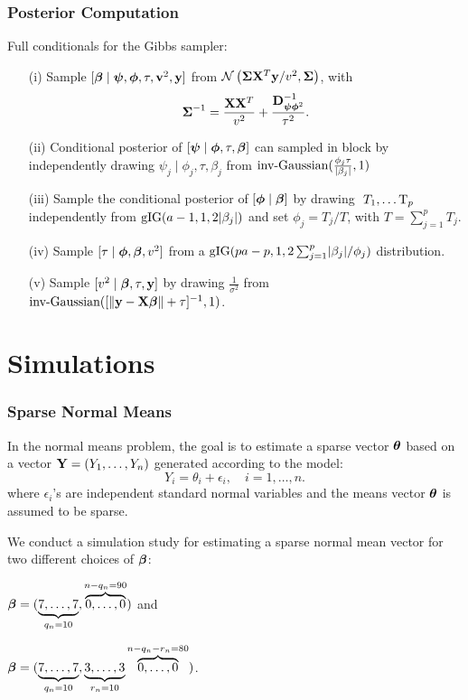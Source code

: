\documentclass[10pt]{beamer}
\theoremstyle{plain}
\newcommand{\blankline}{\quad\pagebreak[3]}
\begin{document}
\begin{frame}
	\frametitle{Posterior Computation}
	Full conditionals for the Gibbs sampler:
	\begin{itemize}
\item[(i)] Sample $[ \boldsymbol{\beta} \mid \boldsymbol{\psi} , \boldsymbol{\phi} , \tau , {\bf v}^2 , {\bf y} ]$ from $\mathcal{N} \left( \boldsymbol{\Sigma} {\bf X}^T{\bf y}/v^2 , \boldsymbol{\Sigma} \right)$, with $$ \boldsymbol{\Sigma}^{-1} = \frac{{\bf X}{\bf X}^T}{v^2} + \frac{{\bf D}^{-1}_{\boldsymbol{\psi} \boldsymbol{\phi}^2}}{\tau^2}.$$
\item[(ii)]Conditional posterior of $[\boldsymbol{\psi} \mid \boldsymbol{\phi} , \tau , \boldsymbol{\beta}]$ can sampled in block  by independently drawing $ \psi_j \mid \phi_j , \tau , \beta_j $ from 
$ \text{inv-Gaussian}(\frac{\phi_j\tau}{\lvert\beta_j\rvert} ,1) $
\item[(iii)] Sample the conditional posterior of $[ \boldsymbol{\phi} \mid \boldsymbol{\beta}]$ by drawing $ \ T_1, \ldots {\rm T}_p$ independently from $\text{gIG}(a-1 , 1 , 2\lvert\beta_j\rvert)$ and set $\phi_j = T_j/T$, with $T = \sum_{j=1}^{p}T_j$.
\item[(iv)] Sample $[ \tau \mid \boldsymbol{\phi}, \boldsymbol{\beta}, v^2 ]$ from a $\text{gIG}( pa-p , 1 , 2\sum^{p}_{j=1}\lvert\beta_j\rvert/\phi_j )$ distribution.
\item[(v)] Sample $[ v^2 \mid \boldsymbol{\beta} ,\tau , {\bf y} ]  $ by drawing $ \frac{1}{\sigma^2} $ from $\text{inv-Gaussian}( [ \lVert{\bf y} - {\bf X}\boldsymbol{\beta}\rVert + \tau ]^{-1} ,1) $.
\end{itemize}
	
\end{frame}



\section{Simulations}

\begin{frame}
	\frametitle{Sparse Normal Means}
	In the normal means problem, the goal is to estimate a sparse vector $\boldsymbol{\theta}$ based on a vector ${\bf Y} = \left(Y_1, \ldots , Y_n \right) $ generated according to the model:
\begin{equation}\label{normal_means}
Y_i = \theta_i + \epsilon_i, \quad i = 1, \ldots, n.
\end{equation}
where $\epsilon_i$'s are independent standard normal variables and the means vector $\boldsymbol{\theta}$ is assumed to be sparse.

We conduct a simulation study for estimating a sparse normal mean vector for two different choices of $\boldsymbol{\beta}$: 
\blankline
\ben
\item $\boldsymbol{\beta} = (\underbrace{7,\ldots,7}_{q_n=10},\overbrace{0,\ldots,0}^{n-q_n = 90})$ and 
\item $\boldsymbol{\beta} = (\underbrace{7,\ldots,7}_{q_{n}=10},\underbrace{3,\ldots,3}_{r_n=10}\overbrace{0,\ldots,0}^{n-q_n-r_n = 80})$.
\een
\end{frame}
\end{document}
